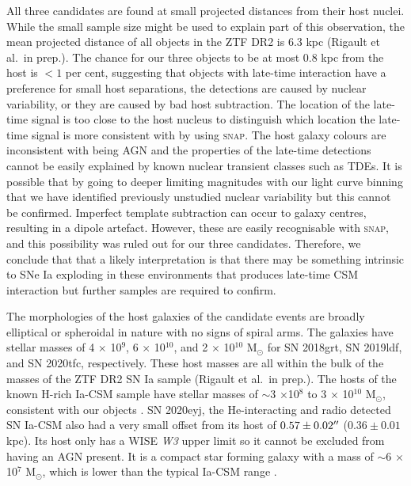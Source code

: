 \documentclass[a4paper,oneside,12pt, class=Latex/Classes/PhDthesisPSnPDF, crop=false]{standalone}
\begin{document}
All three candidates are found at small projected distances from their host nuclei. While the small sample size might be used to explain part of this observation, the mean projected distance of all objects in the ZTF DR2 is 6.3 kpc (Rigault et al.~in prep.). The chance for our three objects to be at most 0.8 kpc from the host is $<1$ per cent, suggesting that objects with late-time interaction have a preference for small host separations, the detections are caused by nuclear variability, or they are caused by bad host subtraction. The location of the late-time signal is too close to the host nucleus to distinguish which location the late-time signal is more consistent with by using \textsc{snap}. The host galaxy colours are inconsistent with being AGN and the properties of the late-time detections cannot be easily explained by known nuclear transient classes such as TDEs. It is possible that by going to deeper limiting magnitudes with our light curve binning that we have identified previously unstudied nuclear variability but this cannot be confirmed. Imperfect template subtraction can occur to galaxy centres, resulting in a dipole artefact. However, these are easily recognisable with \textsc{snap}, and this possibility was ruled out for our three candidates. Therefore, we conclude that that a likely interpretation is that there may be something intrinsic to SNe Ia exploding in these environments that produces late-time CSM interaction but further samples are required to confirm. 

The morphologies of the host galaxies of the candidate events are broadly elliptical or spheroidal in nature with no signs of spiral arms. The galaxies have stellar masses of 4 $\times$ 10$^9$, 6 $\times$ 10$^10$, and 2 $\times$ 10$^{10}$ M$_\odot$ for SN 2018grt, SN 2019ldf, and SN 2020tfc, respectively. These host masses are all within the bulk of the masses of the ZTF DR2 SN Ia sample (Rigault et al.~in prep.). The hosts of the known H-rich Ia-CSM sample have stellar masses of $\sim$3 $\times$10$^8$ to 3 $\times$ 10$^{10}$ M$_\odot$, consistent with our objects \citep{Ia-CSM_BTS}. SN 2020eyj, the He-interacting and radio detected SN Ia-CSM \citep{Kool_He_CSM} also had a very small offset from its host of $0.57\pm0.02^{\prime\prime}$ ($0.36\pm0.01$ kpc). Its host only has a WISE \textit{W3} upper limit so it cannot be excluded from having an AGN present. It is a compact star forming galaxy with a mass of $\sim$6 $\times$ 10$^7$ M$_\odot$, which is lower than the typical Ia-CSM range \citep{Ia-CSM_BTS}. 
\end{document}
